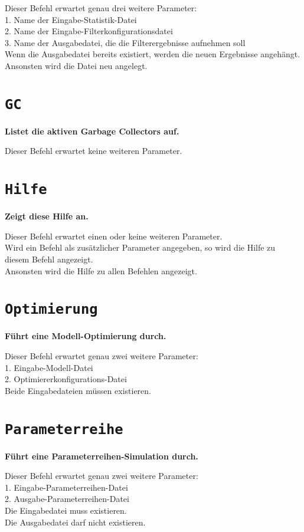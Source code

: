 Dieser Befehl erwartet genau drei weitere Parameter:\\
1. Name der Eingabe-Statistik-Datei\\
2. Name der Eingabe-Filterkonfigurationsdatei\\
3. Name der Ausgabedatei, die die Filterergebnisse aufnehmen soll\\
Wenn die Ausgabedatei bereits existiert, werden die neuen Ergebnisse angehängt.\\
Ansonsten wird die Datei neu angelegt.

\section{\texttt{GC}}

\textbf{Listet die aktiven Garbage Collectors auf.}

Dieser Befehl erwartet keine weiteren Parameter.

\section{\texttt{Hilfe}}

\textbf{Zeigt diese Hilfe an.}

Dieser Befehl erwartet einen oder keine weiteren Parameter.\\
Wird ein Befehl als zusätzlicher Parameter angegeben, so wird die Hilfe zu diesem Befehl angezeigt.\\
Ansonsten wird die Hilfe zu allen Befehlen angezeigt.

\section{\texttt{Optimierung}}

\textbf{Führt eine Modell-Optimierung durch.}

Dieser Befehl erwartet genau zwei weitere Parameter:\\
1. Eingabe-Modell-Datei\\
2. Optimiererkonfigurations-Datei\\
Beide Eingabedateien müssen existieren.

\section{\texttt{Parameterreihe}}

\textbf{Führt eine Parameterreihen-Simulation durch.}

Dieser Befehl erwartet genau zwei weitere Parameter:\\
1. Eingabe-Parameterreihen-Datei\\
2. Ausgabe-Parameterreihen-Datei\\
Die Eingabedatei muss existieren.\\
Die Ausgabedatei darf nicht existieren.

